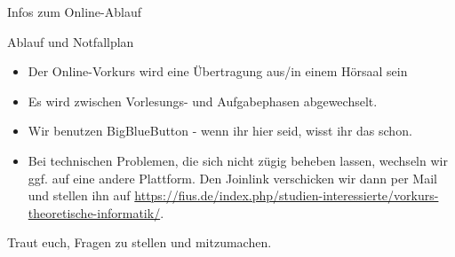 \begin{frame}[fragile]{Infos zum Online-Ablauf}
    \begin{alertblock}{Ablauf und Notfallplan}
        \begin{itemize}
            \item Der Online-Vorkurs wird eine Übertragung aus/in einem Hörsaal sein
            \item Es wird zwischen Vorlesungs- und Aufgabephasen abgewechselt.
            \item Wir benutzen BigBlueButton - wenn ihr hier seid, wisst ihr das schon.
            \item Bei technischen Problemen, die sich nicht zügig beheben lassen, wechseln wir ggf. auf eine andere Plattform. Den Joinlink verschicken wir dann per Mail und stellen ihn auf \url{https://fius.de/index.php/studien-interessierte/vorkurs-theoretische-informatik/}.
        \end{itemize}
        \alert{Traut euch, Fragen zu stellen und mitzumachen.}
    \end{alertblock}
\end{frame}
